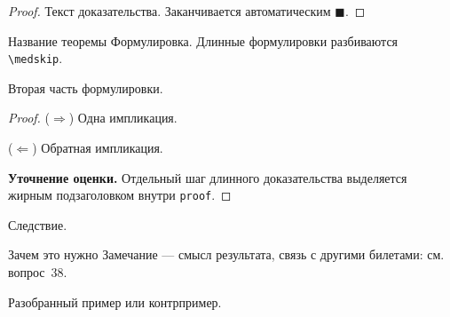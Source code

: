 \begin{proof}
	Текст доказательства. Заканчивается автоматическим $\blacksquare$.
\end{proof}

\begin{Theorem}[required]{Название теоремы}{}
	Формулировка. Длинные формулировки разбиваются \verb|\medskip|.
	
	\medskip
	Вторая часть формулировки.
\end{Theorem}

\begin{proof}
	($\Rightarrow$) Одна импликация.
	
	($\Leftarrow$) Обратная импликация.
	
	\medskip
	\textbf{Уточнение оценки.} Отдельный шаг длинного доказательства
	выделяется жирным подзаголовком внутри \verb|proof|.
\end{proof}

\begin{Corollary}{}{}
	Следствие.
\end{Corollary}

\begin{Remark}{Зачем это нужно}{}
	Замечание — смысл результата, связь с другими билетами:
	см. вопрос~38.
\end{Remark}

\begin{Example}{}{}
	Разобранный пример или контрпример.
\end{Example}
